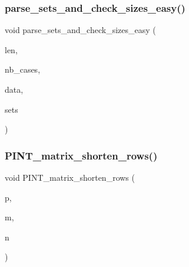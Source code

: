 \subsubsection{\texorpdfstring{parse\+\_\+sets\+\_\+and\+\_\+check\+\_\+sizes\+\_\+easy()}{parse\_sets\_and\_check\_sizes\_easy()}}
{\footnotesize\ttfamily void parse\+\_\+sets\+\_\+and\+\_\+check\+\_\+sizes\+\_\+easy (\begin{DoxyParamCaption}\item[{\mbox{\hyperlink{galois_8h_a09fddde158a3a20bd2dcadb609de11dc}{I\+NT}}}]{len,  }\item[{\mbox{\hyperlink{galois_8h_a09fddde158a3a20bd2dcadb609de11dc}{I\+NT}}}]{nb\+\_\+cases,  }\item[{\mbox{\hyperlink{galois_8h_ab6cc7b4aeb6ea31aba2b3fbfc83ff5e6}{B\+Y\+TE}} $\ast$$\ast$}]{data,  }\item[{\mbox{\hyperlink{galois_8h_a09fddde158a3a20bd2dcadb609de11dc}{I\+NT}} $\ast$$\ast$\&}]{sets }\end{DoxyParamCaption})}

\mbox{\label{util_8_c_afc6c8b9d099a3c564c88994ec233cf63}} 
\subsubsection{\texorpdfstring{P\+I\+N\+T\+\_\+matrix\+\_\+shorten\+\_\+rows()}{PINT\_matrix\_shorten\_rows()}}
{\footnotesize\ttfamily void P\+I\+N\+T\+\_\+matrix\+\_\+shorten\+\_\+rows (\begin{DoxyParamCaption}\item[{\mbox{\hyperlink{galois_8h_a3a27622aa6de9b4e74d9798d0aa4031b}{P\+I\+NT}} $\ast$\&}]{p,  }\item[{\mbox{\hyperlink{galois_8h_a09fddde158a3a20bd2dcadb609de11dc}{I\+NT}}}]{m,  }\item[{\mbox{\hyperlink{galois_8h_a09fddde158a3a20bd2dcadb609de11dc}{I\+NT}}}]{n }\end{DoxyParamCaption})}

\mbox{\label{util_8_c_a5ede1e36cd1bbc5dd85a732ce57118da}} 
